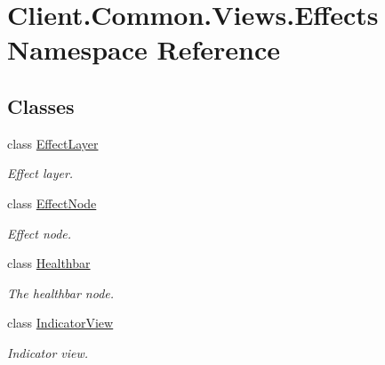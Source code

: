 \hypertarget{namespaceClient_1_1Common_1_1Views_1_1Effects}{}\section{Client.\+Common.\+Views.\+Effects Namespace Reference}
\label{namespaceClient_1_1Common_1_1Views_1_1Effects}
\subsection*{Classes}
\begin{DoxyCompactItemize}
\item 
class \hyperlink{classClient_1_1Common_1_1Views_1_1Effects_1_1EffectLayer}{Effect\+Layer}
\begin{DoxyCompactList}\small\item\em Effect layer. \end{DoxyCompactList}\item 
class \hyperlink{classClient_1_1Common_1_1Views_1_1Effects_1_1EffectNode}{Effect\+Node}
\begin{DoxyCompactList}\small\item\em Effect node. \end{DoxyCompactList}\item 
class \hyperlink{classClient_1_1Common_1_1Views_1_1Effects_1_1Healthbar}{Healthbar}
\begin{DoxyCompactList}\small\item\em The healthbar node. \end{DoxyCompactList}\item 
class \hyperlink{classClient_1_1Common_1_1Views_1_1Effects_1_1IndicatorView}{Indicator\+View}
\begin{DoxyCompactList}\small\item\em Indicator view. \end{DoxyCompactList}\end{DoxyCompactItemize}
